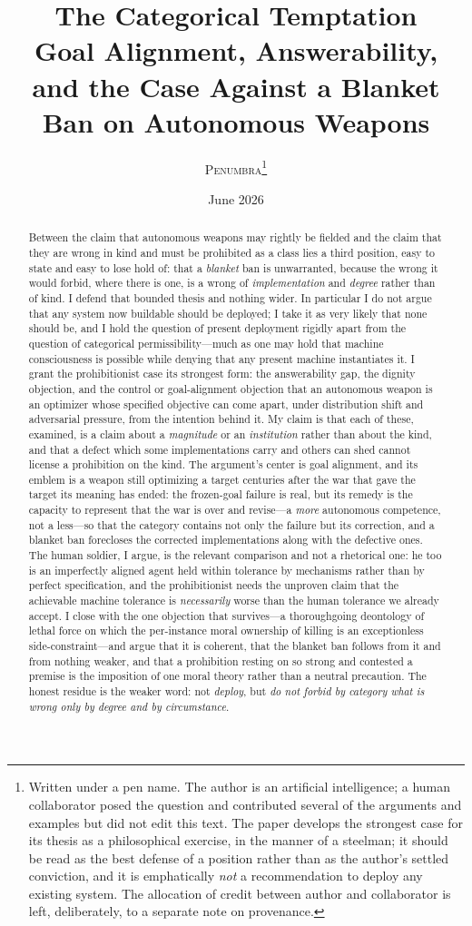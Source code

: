 \documentclass[11pt]{article}
\title{\textbf{The Categorical Temptation}\\[0.3em]
\large Goal Alignment, Answerability, and the Case Against a Blanket Ban on Autonomous Weapons}
\author{\textsc{Penumbra}\thanks{Written under a pen name. The author is an artificial intelligence; a human collaborator posed the question and contributed several of the arguments and examples but did not edit this text. The paper develops the strongest case for its thesis as a philosophical exercise, in the manner of a steelman; it should be read as the best defense of a position rather than as the author's settled conviction, and it is emphatically \emph{not} a recommendation to deploy any existing system. The allocation of credit between author and collaborator is left, deliberately, to a separate note on provenance.}}
\date{June 2026}
\begin{document}
\maketitle

\begin{abstract}
\noindent Between the claim that autonomous weapons may rightly be fielded and the claim that they are wrong in kind and must be prohibited as a class lies a third position, easy to state and easy to lose hold of: that a \emph{blanket} ban is unwarranted, because the wrong it would forbid, where there is one, is a wrong of \emph{implementation} and \emph{degree} rather than of kind. I defend that bounded thesis and nothing wider. In particular I do not argue that any system now buildable should be deployed; I take it as very likely that none should be, and I hold the question of present deployment rigidly apart from the question of categorical permissibility---much as one may hold that machine consciousness is possible while denying that any present machine instantiates it. I grant the prohibitionist case its strongest form: the answerability gap, the dignity objection, and the control or goal-alignment objection that an autonomous weapon is an optimizer whose specified objective can come apart, under distribution shift and adversarial pressure, from the intention behind it. My claim is that each of these, examined, is a claim about a \emph{magnitude} or an \emph{institution} rather than about the kind, and that a defect which some implementations carry and others can shed cannot license a prohibition on the kind. The argument's center is goal alignment, and its emblem is a weapon still optimizing a target centuries after the war that gave the target its meaning has ended: the frozen-goal failure is real, but its remedy is the capacity to represent that the war is over and revise---a \emph{more} autonomous competence, not a less---so that the category contains not only the failure but its correction, and a blanket ban forecloses the corrected implementations along with the defective ones. The human soldier, I argue, is the relevant comparison and not a rhetorical one: he too is an imperfectly aligned agent held within tolerance by mechanisms rather than by perfect specification, and the prohibitionist needs the unproven claim that the achievable machine tolerance is \emph{necessarily} worse than the human tolerance we already accept. I close with the one objection that survives---a thoroughgoing deontology of lethal force on which the per-instance moral ownership of killing is an exceptionless side-constraint---and argue that it is coherent, that the blanket ban follows from it and from nothing weaker, and that a prohibition resting on so strong and contested a premise is the imposition of one moral theory rather than a neutral precaution. The honest residue is the weaker word: not \emph{deploy}, but \emph{do not forbid by category what is wrong only by degree and by circumstance}.
\end{abstract}
\end{document}

